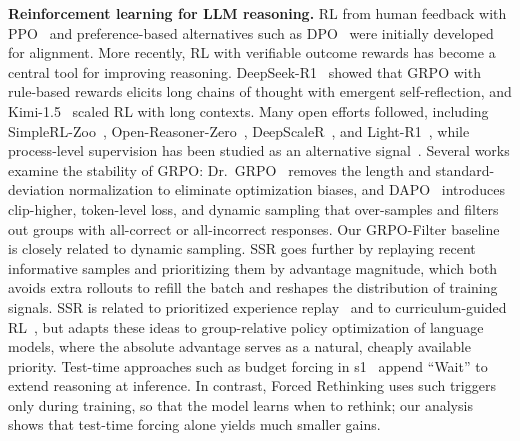\documentclass{article}
\begin{document}
\textbf{Reinforcement learning for LLM reasoning.} RL from human feedback with PPO~\cite{ppo,instructgpt} and preference-based alternatives such as DPO~\cite{DPO} were initially developed for alignment. More recently, RL with verifiable outcome rewards has become a central tool for improving reasoning. DeepSeek-R1~\cite{deepseek-r1} showed that GRPO with rule-based rewards elicits long chains of thought with emergent self-reflection, and Kimi-1.5~\cite{kimi-1_5} scaled RL with long contexts. Many open efforts followed, including SimpleRL-Zoo~\cite{simplerl}, Open-Reasoner-Zero~\cite{open-reasoner-zero}, DeepScaleR~\cite{deepscaler2025}, and Light-R1~\cite{lightr1}, while process-level supervision has been studied as an alternative signal~\cite{letsverify}. Several works examine the stability of GRPO: Dr.\ GRPO~\cite{drgrpo} removes the length and standard-deviation normalization to eliminate optimization biases, and DAPO~\cite{dapo} introduces clip-higher, token-level loss, and dynamic sampling that over-samples and filters out groups with all-correct or all-incorrect responses. Our GRPO-Filter baseline is closely related to dynamic sampling. SSR goes further by replaying recent informative samples and prioritizing them by advantage magnitude, which both avoids extra rollouts to refill the batch and reshapes the distribution of training signals. SSR is related to prioritized experience replay~\cite{per} and to curriculum-guided RL~\cite{curriculum}, but adapts these ideas to group-relative policy optimization of language models, where the absolute advantage serves as a natural, cheaply available priority. Test-time approaches such as budget forcing in s1~\cite{s1} append ``Wait'' to extend reasoning at inference. In contrast, Forced Rethinking uses such triggers only during training, so that the model learns when to rethink; our analysis shows that test-time forcing alone yields much smaller gains.
\end{document}
